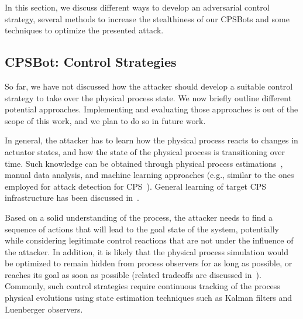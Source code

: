 \documentclass[sigconf]{acmart}
\makeatletter
\newcommand{\Botnet}{CPSBot\@\xspace}
\newcommand{\Botnets}{CPSBots\@\xspace}
\makeatother
\begin{document}
In this section, we discuss different ways to develop an
adversarial control strategy, several methods to increase the
stealthiness of our \Botnets and some techniques to optimize
the presented attack.

\subsection{\Botnet: Control Strategies}
\label{sec:learning}

So far, we have not discussed how the attacker should develop a
suitable control strategy to take over the physical process state. We
now briefly outline different potential approaches. Implementing and
evaluating those approaches is out of the scope of this work, and we plan
to do so in future work.


In general, the attacker has to learn how the physical process reacts to
changes in actuator states, and how the state of the physical process
is transitioning over time. Such knowledge can be obtained through
physical process estimations~\cite{garcia2017use,ljung1998system}, manual
data analysis, and machine learning approaches (e.g., similar to the
ones employed for attack detection for CPS~\cite{ozay2016machine}).
General learning of target CPS infrastructure has been discussed
in~\cite{feng16characterizing}.

Based on a solid understanding of the process, the attacker needs to find
a sequence of actions that will lead to the goal state of the system,
potentially while considering legitimate control reactions that are not under
the influence of the attacker. In addition, it is likely that the physical
process simulation would be optimized to remain hidden from process observers
for as long as possible, or reaches its goal as soon as possible (related
tradeoffs are discussed in~\cite{urbina2016limiting}). Commonly, such control
strategies require continuous tracking of the process physical evolutions
using state estimation techniques such as Kalman filters and Luenberger
observers.


\end{document}

